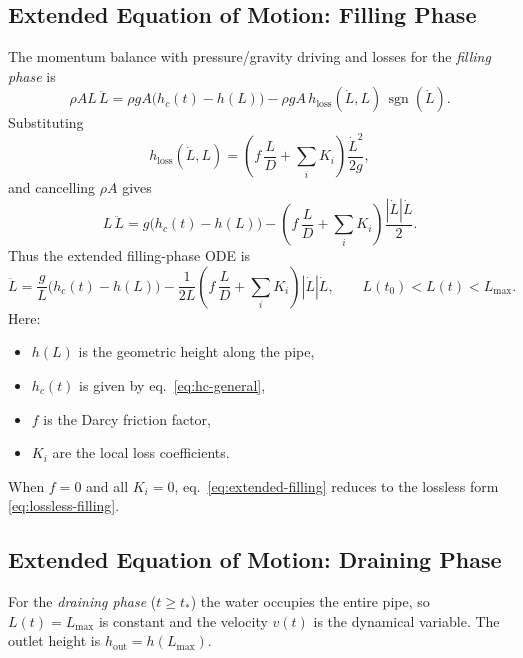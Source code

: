 \documentclass[11pt]{article}
\begin{document}
\subsection{Extended Equation of Motion: Filling Phase}

The momentum balance with pressure/gravity driving and losses for the
\emph{filling phase} is
\[
\rho A L\,\ddot L
= \rho g A\bigl(h_c(t) - h(L)\bigr)
  - \rho g A\,h_{\text{loss}}(\dot L,L)\,\operatorname{sgn}(\dot L).
\]
Substituting
\[
h_{\text{loss}}(\dot L,L)
= \left(
    f\,\frac{L}{D}
    + \sum_i K_i
  \right)\frac{\dot L^2}{2g},
\]
and cancelling $\rho A$ gives
\[
L\,\ddot L
= g\bigl(h_c(t) - h(L)\bigr)
  - \left(
      f\,\frac{L}{D}
      + \sum_i K_i
    \right)\frac{|\dot L|\dot L}{2}.
\]
Thus the extended filling-phase ODE is
\begin{equation}
\ddot L
= \frac{g}{L}\bigl(h_c(t) - h(L)\bigr)
  - \frac{1}{2L}
    \left(
      f\,\frac{L}{D}
      + \sum_i K_i
    \right)|\dot L|\dot L,
\qquad L(t_0) < L(t) < L_{\max}.
\label{eq:extended-filling}
\end{equation}
Here:
\begin{itemize}
  \item $h(L)$ is the geometric height along the pipe,
  \item $h_c(t)$ is given by eq.~\eqref{eq:hc-general},
  \item $f$ is the Darcy friction factor,
  \item $K_i$ are the local loss coefficients.
\end{itemize}
When $f=0$ and all $K_i=0$, eq.~\eqref{eq:extended-filling} reduces to the
lossless form \eqref{eq:lossless-filling}.

\subsection{Extended Equation of Motion: Draining Phase}

For the \emph{draining phase} ($t \ge t_\ast$) the water occupies the entire
pipe, so $L(t) = L_{\max}$ is constant and the velocity $v(t)$ is the dynamical
variable. The outlet height is $h_{\text{out}} = h(L_{\max})$.
\end{document}
